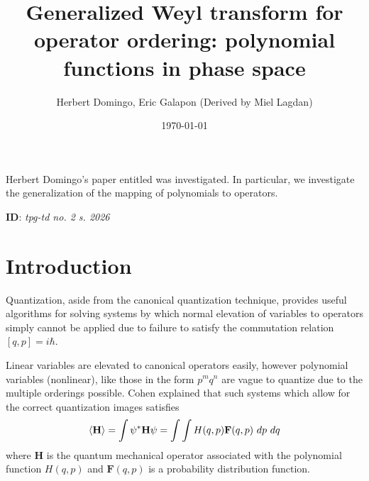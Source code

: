 \documentclass[a4paper]{article}
\title{\textbf{Generalized Weyl transform for operator ordering: polynomial functions in phase space} \cite{Domingo2015-sr}}
\author{Herbert Domingo, Eric Galapon (Derived by Miel Lagdan)}
\date{\today}
\theoremstyle{definition}
\begin{document}
	\maketitle
	\noindent Herbert Domingo's paper entitled was investigated. In particular, we investigate the generalization of the mapping of polynomials to operators.
	
	\textbf{ID}: \textit{tpg-td no. 2 s. 2026}
	
	\tableofcontents

\section{Introduction}
Quantization, aside from the canonical quantization technique, provides useful algorithms for solving systems by which normal elevation of variables to operators simply cannot be applied due to failure to satisfy the commutation relation $[q,p]=i\hbar$.

Linear variables are elevated to canonical operators easily, however polynomial variables (nonlinear), like those in the form $p^mq^n$ are vague to quantize due to the multiple orderings possible. Cohen \cite{Cohen1976-wr} explained that such systems which allow for the correct quantization images satisfies
\begin{equation}
	\Braket{\textbf{H}}=\int\psi^*\textbf{H}\psi=\int\int H(q,p)\textbf{F}(q,p)~dp~dq
\end{equation}
where \textbf{H} is the quantum mechanical operator associated with the polynomial function $H(q,p)$ and $\textbf{F}(q,p)$ is a probability distribution function.
\newpage
\printbibliography
\end{document}
